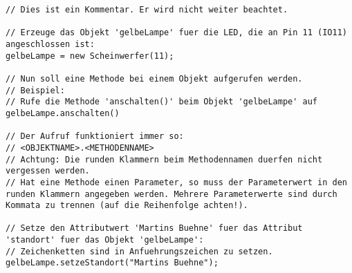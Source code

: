 \documentclass[11pt, a4paper]{article}
\begin{document}
\lstset{language=Java}
\javastyle 
\begin{lstlisting}[caption={Steuerung eines Scheinwerfers.},label={listing:einfache_led}]
// Dies ist ein Kommentar. Er wird nicht weiter beachtet.

// Erzeuge das Objekt 'gelbeLampe' fuer die LED, die an Pin 11 (IO11) angeschlossen ist:
gelbeLampe = new Scheinwerfer(11);

// Nun soll eine Methode bei einem Objekt aufgerufen werden.
// Beispiel: 
// Rufe die Methode 'anschalten()' beim Objekt 'gelbeLampe' auf
gelbeLampe.anschalten()

// Der Aufruf funktioniert immer so: 
// <OBJEKTNAME>.<METHODENNAME>
// Achtung: Die runden Klammern beim Methodennamen duerfen nicht vergessen werden.
// Hat eine Methode einen Parameter, so muss der Parameterwert in den runden Klammern angegeben werden. Mehrere Parameterwerte sind durch Kommata zu trennen (auf die Reihenfolge achten!).

// Setze den Attributwert 'Martins Buehne' fuer das Attribut 'standort' fuer das Objekt 'gelbeLampe':
// Zeichenketten sind in Anfuehrungszeichen zu setzen.
gelbeLampe.setzeStandort("Martins Buehne");
\end{lstlisting}
\end{document}
